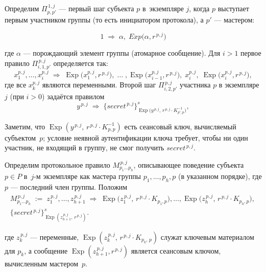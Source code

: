 Определим \(\Pi^{\,1,j}_{p,p'}\) — первый шаг субъекта \(p\)  
в~экземпляре \(j\), когда \(p\) выступает первым участником группы
(то есть инициатором протокола), а \(p'\) — мастером:

\[
1 \;\Rightarrow\; \alpha,\; Exp\!\bigl(\alpha,r^{\,p,j}\bigr)
\]

где $\alpha$ — порождающий элемент группы (атомарное сообщение).  
Для $i>1$ первое правило
\(\Pi_{i,1,p'}^{\,p,j}\) определяется так:
\[
  x_{1}^{p,j},\dots,x_{i}^{p,j}
  \; \Longrightarrow \;
  \operatorname{Exp}\!\bigl(x_{1}^{p,j},r^{\,p,j}\bigr),
  \;\dots\;,
  \operatorname{Exp}\!\bigl(x_{i-1}^{p,j},r^{\,p,j}\bigr),
  \;x_{i}^{p,j},
  \;\operatorname{Exp}\!\bigl(x_{i}^{p,j},r^{\,p,j}\bigr),
\]
где все \(x_{k}^{p,j}\) являются переменными.
Второй шаг \(\Pi_{i,2,p'}^{\,p,j}\) участника \(p\) в экземпляре \(j\)
(при \(i>0\)) задаётся правилом
\[
  y^{\,p,j}
  \;\Longrightarrow\;
  \bigl\{\mathit{secret}^{\,p,j}\bigr\}_{
  \operatorname{Exp}\!\bigl(y^{\,p,j},\,r^{\,p,j}\!\cdot\!K_{p',p}^{-1}\bigr)}^s,
\]

Заметим, что
\(\operatorname{Exp}(y^{\,p,j},\,r^{\,p,j}\!\cdot\!K^{-1}_{p,p})\)
есть сеансовый ключ, вычисляемый субъектом~\(p\);
условие неявной аутентификации ключа требует, чтобы
ни один участник, не входящий в группу, не смог получить
\(\mathit{secret}^{\,p,j}\).

Определим протокольное правило
\(M_{p_{1}\dots p_{h}}^{\,p,j}\),
описывающее поведение субъекта \(p\in P\)
в~\(j\)-м экземпляре как мастера группы
\(p_{1},\dots,p_{h},p\) (в указанном порядке),
где \(p\) — последний член группы.
Положим
\[
  \begin{aligned}
     M_{p_{1}\dots p_{h}}^{\,p,j}\;:=\;
     z_{1}^{\,p,j},\dots,z_{h+1}^{\,p,j}
     \;\Longrightarrow\;
     \operatorname{Exp}\!\bigl(z_{1}^{\,p,j},\,r^{\,p,j}\!\cdot\!K_{p_{1},p}\bigr),
     \dots,
     \operatorname{Exp}\!\bigl(z_{h}^{\,p,j},\,r^{\,p,j}\!\cdot\!K_{p_{h},p}\bigr),
     \,\\
     \bigl\{\mathit{secret}^{\,p,j}\bigr\}_{
            \operatorname{Exp}(z_{h+1}^{\,p,j},\,r^{\,p,j})}^s.
  \end{aligned}
\]

где $z_{k}^{\,p,j}$ — переменные,
$\operatorname{Exp}(z_{k}^{\,p,j},\,r^{\,p,j}\!\cdot\!K_{p_{k},\,p})$
служат ключевым материалом для $p_{k}$,
а сообщение $\operatorname{Exp}(z_{h+1}^{\,p,j},r^{\,p,j})$
является сеансовым ключом, вычисленным мастером~$p$.

